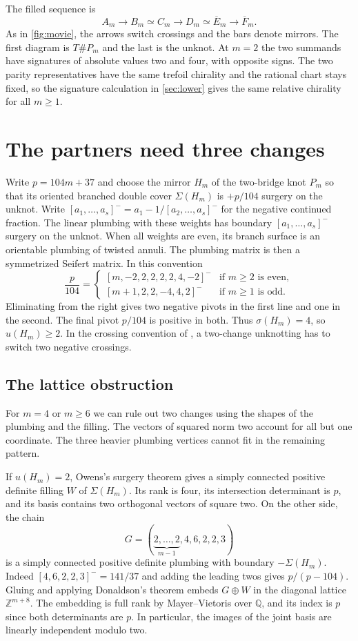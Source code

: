 \documentclass[a4paper,11pt]{amsart}
\numberwithin{equation}{subsection}
\theoremstyle{plain}
\theoremstyle{remark}
\begin{document}
The filled sequence is
\[
A_m\longrightarrow B_m\simeq C_m\longrightarrow D_m
\simeq \overline E_m\longrightarrow\overline F_m .
\]
As in \autoref{fig:movie}, the arrows switch crossings and the bars denote mirrors. The first diagram is $T\#P_m$ and the last is the unknot. At $m=2$ the two summands have signatures of absolute values two and four, with opposite signs. The two parity representatives have the same trefoil chirality and the rational chart stays fixed, so the signature calculation in \autoref{sec:lower} gives the same relative chirality for all $m\geq1$.

\section{The partners need three changes}\label{sec:lower}

Write $p=104m+37$ and choose the mirror $H_m$ of the two-bridge knot $P_m$ so that its oriented branched double cover $\Sigma(H_m)$ is $+p/104$ surgery on the unknot. Write $[a_1,\ldots,a_s]^-=a_1-1/[a_2,\ldots,a_s]^-$ for the negative continued fraction. The linear plumbing with these weights has boundary $[a_1,\ldots,a_s]^-$ surgery on the unknot. When all weights are even, its branch surface is an orientable plumbing of twisted annuli. The plumbing matrix is then a symmetrized Seifert matrix. In this convention
\[
\frac{p}{104}=
\begin{cases}
[m,-2,2,2,2,2,4,-2]^- & \text{if $m\geq 2$ is even},\\
[m+1,2,2,-4,4,2]^- & \text{if $m\geq 1$ is odd}.
\end{cases}
\]
Eliminating from the right gives two negative pivots in the first line and one in the second. The final pivot $p/104$ is positive in both. Thus $\sigma(H_m)=4$, so $u(H_m)\geq 2$. In the crossing convention of \cite{Owens}, a two-change unknotting has to switch two negative crossings.

\subsection{The lattice obstruction}\label{sub:lattice}

For $m=4$ or $m\geq6$ we can rule out two changes using the shapes of the plumbing and the filling. The vectors of squared norm two account for all but one coordinate. The three heavier plumbing vertices cannot fit in the remaining pattern.

If $u(H_m)=2$, Owens's surgery theorem \cite[Theorem~3 and Lemma~2.2]{Owens} gives a simply connected positive definite filling $W$ of $\Sigma(H_m)$. Its rank is four, its intersection determinant is $p$, and its basis contains two orthogonal vectors of square two. On the other side, the chain
\[
G=(\underbrace{2,\ldots,2}_{m-1},4,6,2,2,3)
\]
is a simply connected positive definite plumbing with boundary $-\Sigma(H_m)$. Indeed $[4,6,2,2,3]^-=141/37$ and adding the leading twos gives $p/(p-104)$. Gluing and applying Donaldson's theorem \cite{Donaldson} embeds $G\oplus W$ in the diagonal lattice $\mathbb{Z}^{m+8}$. The embedding is full rank by Mayer--Vietoris over $\mathbb Q$, and its index is $p$ since both determinants are $p$. In particular, the images of the joint basis are linearly independent modulo two.
\end{document}
